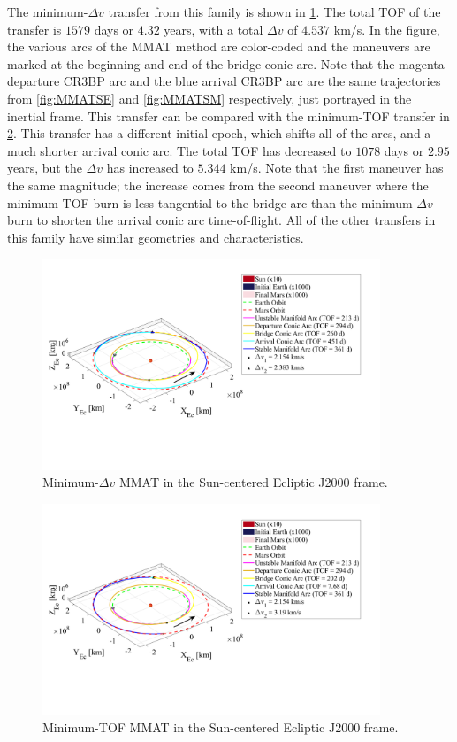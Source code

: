 The minimum-$\Delta v$ transfer from this family is shown in \cref{fig:MMATDv}. The total TOF of
the transfer is $1579$ days or $4.32$ years, with a total $\Delta v$ of $4.537$ km/s. In the
figure, the various arcs of the MMAT method are color-coded and the maneuvers are marked at the
beginning and end of the bridge conic arc. Note that the magenta departure CR3BP arc and the blue
arrival CR3BP arc are the same trajectories from \cref{fig:MMATSE} and \cref{fig:MMATSM}
respectively, just portrayed in the inertial frame. This transfer can be compared with the
minimum-TOF transfer in \cref{fig:MMATTOF}. This transfer has a different initial epoch, which
shifts all of the arcs, and a much shorter arrival conic arc. The total TOF has decreased to $1078$
days or $2.95$ years, but the $\Delta v$ has increased to $5.344$ km/s. Note that the first
maneuver has the same magnitude; the increase comes from the second maneuver where the minimum-TOF
burn is less tangential to the bridge arc than the minimum-$\Delta v$ burn to shorten the arrival
conic arc time-of-flight. All of the other transfers in this family have similar geometries and
characteristics.

\begin{figure}[ht]
    \centering
    \includegraphics[width=0.9\textwidth]{figures/MinDvMMAT.pdf}
    \caption{Minimum-$\Delta v$ MMAT in the Sun-centered Ecliptic J2000 frame.}
    \label{fig:MMATDv}
\end{figure}

\begin{figure}[ht]
    \centering
    \includegraphics[width=0.9\textwidth]{figures/MinTOFMMAT.pdf}
    \caption{Minimum-TOF MMAT in the Sun-centered Ecliptic J2000 frame.}
    \label{fig:MMATTOF}
\end{figure}
